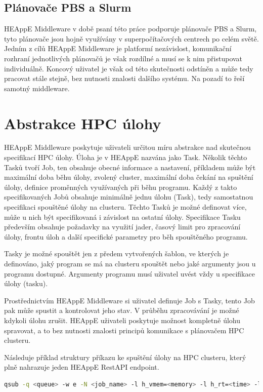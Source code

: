 \subsection{Plánovače PBS a Slurm}
HEAppE Middleware v době psaní této práce podporuje plánovače PBS a Slurm, tyto plánovače jsou hojně využívány v superpočítačových centrech po celém světě. Jedním z cílů HEAppE Middleware je platformí nezávislost, komunikační rozhraní jednotlivých plánovačů je však rozdílné a musí se k nim přistupovat individuálně. Koncový uživatel je však od této skutečnosti odstíněn a může tedy pracovat stále stejně, bez nutnosti znalosti dalšího systému. Na pozadí to řeší samotný middleware.


\section{Abstrakce HPC úlohy}
HEAppE Middleware poskytuje uživateli určitou míru abstrakce nad skutečnou specifikací HPC úlohy. Úloha je v HEAppE nazvána jako Task. Několik těchto Tasků tvoří Job, ten obsahuje obecné informace a nastavení, příkladem může být maximální doba běhu úlohy, zvolený cluster, maximální doba čekání na spuštění úlohy, definice proměnných využívaných při běhu programu. Každý z takto specifikovaných Jobů obsahuje minimálně jednu úlohu (Task), tedy samostatnou specifikaci spouštěné úlohy na clusteru. Těchto Tasků je možné definovat více, může u nich být specifikovaná i závislost na ostatní úlohy. Specifikace Tasku především obsahuje požadavky na využití jader, časový limit pro zpracování úlohy, frontu úloh a další specifické parametry pro běh spouštěného programu.

Tasky je možné spouštět jen z předem vytvořených šablon, ve kterých je definováno, jaký program se má na clusteru spouštět nebo jaké argumenty jsou u programu dostupné. Argumenty programu musí uživatel uvést vždy u specifikace úlohy (tasku).

Prostřednictvím HEAppE Middleware si uživatel definuje Job s Tasky, tento Job pak může spustit a kontrolovat jeho stav. V průběhu zpracovávání je možné kdykoli úlohu zrušit. HEAppE uživateli poskytuje možnost kompletně úlohu spravovat, a to bez nutnosti znalosti principů komunikace s plánovačem HPC clusteru.

Následuje příklad struktury příkazu ke spuštění úlohy na HPC clusteru, který plně nahrazuje jeden HEAppE RestAPI endpoint.

\begin{lstlisting}[language=bash,caption={Struktura příkazu qsub \cite{iR8VZfeCCZ757gs1}}]
qsub -q <queue> -w e -N <job_name> -l h_vmem=<memory> -l h_rt=<time> -l s_rt=<time> -pe smp <num_slots> -o <outputlogfile> -e <errorlogfile> <pathtoScript> <arg1> <arg2>
\end{lstlisting}

